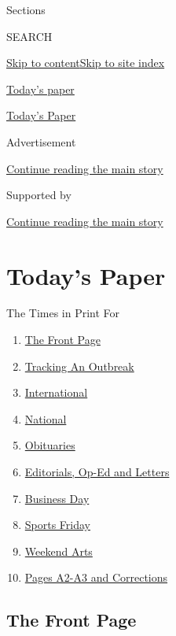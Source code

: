 Sections

SEARCH

\protect\hyperlink{site-content}{Skip to
content}\protect\hyperlink{site-index}{Skip to site index}

\href{https://www.nytimes.com/section/todayspaper}{Today's paper}

\href{https://myaccount.nytimes.com/auth/login?response_type=cookie\&client_id=vi}{}

\href{https://www.nytimes.com/section/todayspaper}{Today's Paper}

Advertisement

\protect\hyperlink{after-top}{Continue reading the main story}

Supported by

\protect\hyperlink{after-sponsor}{Continue reading the main story}

\hypertarget{todays-paper}{%
\section{Today's Paper}\label{todays-paper}}

The Times in Print For

\begin{enumerate}
\def\labelenumi{\arabic{enumi}.}
\tightlist
\item
  \protect\hyperlink{thefrontpage}{The Front Page}
\item
  \protect\hyperlink{trackinganoutbreak}{Tracking An Outbreak}
\item
  \protect\hyperlink{international}{International}
\item
  \protect\hyperlink{national}{National}
\item
  \protect\hyperlink{obituaries}{Obituaries}
\item
  \protect\hyperlink{editorialsux2cop-edandletters}{Editorials, Op-Ed
  and Letters}
\item
  \protect\hyperlink{businessday}{Business Day}
\item
  \protect\hyperlink{sportsfriday}{Sports Friday}
\item
  \protect\hyperlink{weekendarts}{Weekend Arts}
\item
  \protect\hyperlink{pagesa2-a3andcorrections}{Pages A2-A3 and
  Corrections}
\end{enumerate}

\hypertarget{the-front-page}{%
\subsection{The Front Page}\label{the-front-page}}

